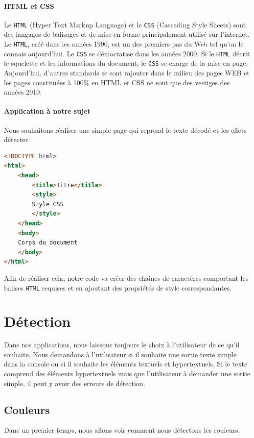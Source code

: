 \documentclass[a4paper,12pt,titlepage]{report}
\begin{document}
	\paragraph{HTML et CSS} Le \texttt{HTML} (Hyper Text Markup Language) et le \texttt{CSS} (Cascading Style Sheets) sont des langages de balisages et de mise en forme principalement utilisé sur l'internet. Le \texttt{HTML}, créé dans les années 1990, est un des premiers pas du Web tel qu'on le connais aujourd'hui. Le \texttt{CSS} se démocratise dans les années 2000. Si le \texttt{HTML} décrit le squelette et les informations du document, le \texttt{CSS} se charge de la mise en page. Aujourd'hui, d'autres standards se sont rajouter dans le milieu des pages WEB et les pages constituées à 100\% en HTML et CSS ne sont que des vestiges des années 2010.\newpage
	\paragraph{Application à notre sujet} Nous souhaitons réaliser une simple page qui reprend le texte décodé et les effets détecter.
\begin{lstlisting}[caption={Structure de base du HTML},language=HTML]
<!DOCTYPE html>
<html>
	<head>
		<title>Titre</title>
		<style>
		Style CSS
		</style>
	</head>
	<body>
	Corps du document
	</body>
</html>
\end{lstlisting}
	Afin de réaliser cela, notre code va créer des chaines de caractères comportant les balises \texttt{HTML} requises et en ajoutant des propriétés de style correspondantes.
	\section{Détection}
	Dans nos applications, nous laissons toujours le choix à l'utilisateur de ce qu'il souhaite. Nous demandons à l'utilisateur si il souhaite une sortie texte simple dans la console ou si il souhaite les éléments textuels et hypertextuels. Si le texte comprend des éléments hypertextuels mais que l'utilisateur à demander une sortie simple, il peut y avoir des erreurs de détection.
	\subsection{Couleurs}
	Dans un premier temps, nous allons voir comment nous détectons les couleurs. 
\end{document}

